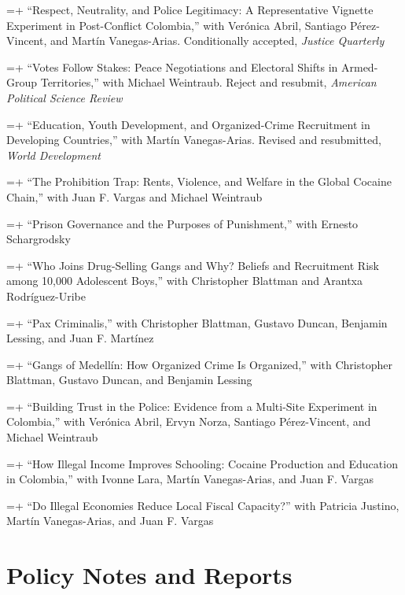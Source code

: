 \documentclass[10pt]{article}
\newlength{\datecolwidth}
\newlength{\gapwidth}
\newcommand{\cventry}[2]{%
  \par\hangindent=\dimexpr\datecolwidth+\gapwidth\relax\hangafter=1
  \noindent\makebox[\datecolwidth][l]{#1}\hspace{\gapwidth}#2\par\vspace{0.1ex}}
\begin{document}
\cventry{}{``Respect, Neutrality, and Police Legitimacy: A Representative Vignette Experiment in Post-Conflict Colombia,'' with Ver\'{o}nica Abril, Santiago P\'{e}rez-Vincent, and Mart\'{i}n Vanegas-Arias. Conditionally accepted, \textit{Justice Quarterly}}
\cventry{}{``Votes Follow Stakes: Peace Negotiations and Electoral Shifts in Armed-Group Territories,'' with Michael Weintraub. Reject and resubmit, \textit{American Political Science Review}}
\cventry{}{``Education, Youth Development, and Organized-Crime Recruitment in Developing Countries,'' with Mart\'{i}n Vanegas-Arias. Revised and resubmitted, \textit{World Development}}
\cventry{}{``The Prohibition Trap: Rents, Violence, and Welfare in the Global Cocaine Chain,'' with Juan F. Vargas and Michael Weintraub}
\cventry{}{``Prison Governance and the Purposes of Punishment,'' with Ernesto Schargrodsky} %
\cventry{}{``Who Joins Drug-Selling Gangs and Why? Beliefs and Recruitment Risk among 10,000 Adolescent Boys,'' with Christopher Blattman and Arantxa Rodr\'{i}guez-Uribe}
\cventry{}{``Pax Criminalis,'' with Christopher Blattman, Gustavo Duncan, Benjamin Lessing, and Juan F. Mart\'{i}nez}
\cventry{}{``Gangs of Medell\'{i}n: How Organized Crime Is Organized,'' with Christopher Blattman, Gustavo Duncan, and Benjamin Lessing}
\cventry{}{``Building Trust in the Police: Evidence from a Multi-Site Experiment in Colombia,'' with Ver\'{o}nica Abril, Ervyn Norza, Santiago P\'{e}rez-Vincent, and Michael Weintraub} %
\cventry{}{``How Illegal Income Improves Schooling: Cocaine Production and Education in Colombia,'' with Ivonne Lara, Mart\'{i}n Vanegas-Arias, and Juan F. Vargas}
\cventry{}{ ``Do Illegal Economies Reduce Local Fiscal Capacity?'' with Patricia Justino, Mart\'{i}n Vanegas-Arias, and Juan F. Vargas}

\section*{Policy Notes and Reports}



\end{document}

